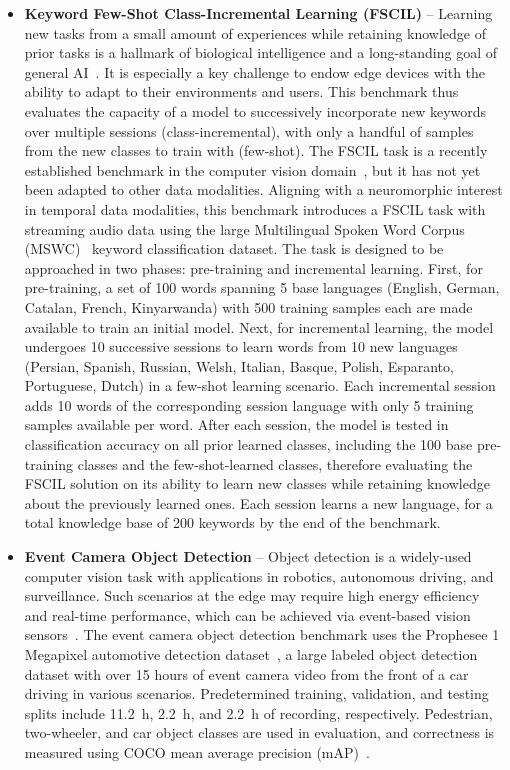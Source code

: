     \begin{itemize}
        \item \textbf{Keyword Few-Shot Class-Incremental Learning (FSCIL)} --
        Learning new tasks from a small amount of experiences while retaining knowledge of prior tasks is a hallmark of biological intelligence and a long-standing goal of general AI~\cite{kudithipudi22biological}. It is especially a key challenge to endow edge devices with the ability to adapt to their environments and users. This benchmark thus evaluates the capacity of a model to successively incorporate new keywords over multiple sessions (class-incremental), with only a handful of samples from the new classes to train with (few-shot). The FSCIL task is a recently established benchmark in the computer vision domain~\cite{tao2020fscil}, but it has not yet been adapted to other data modalities. Aligning with a neuromorphic interest in temporal data modalities, this benchmark introduces a FSCIL task with streaming audio data using the large Multilingual Spoken Word Corpus (MSWC)~\cite{mazumder21mswc} keyword classification dataset. The task is designed to be approached in two phases: pre-training and incremental learning. First, for pre-training, a set of 100 words spanning 5 base languages (English, German, Catalan, French, Kinyarwanda) with 500 training samples each are made available to train an initial model. Next, for incremental learning, the model undergoes 10 successive sessions to learn words from 10 new languages (Persian, Spanish, Russian, Welsh, Italian, Basque, Polish, Esparanto, Portuguese, Dutch) in a few-shot learning scenario. Each incremental session adds 10 words of the corresponding session language with only 5 training samples available per word. After each session, the model is tested in classification accuracy on all prior learned classes, including the 100 base pre-training classes and the few-shot-learned classes,
        therefore evaluating the FSCIL solution on its ability to learn new classes while retaining knowledge about the previously learned ones. Each session learns a new language, for a total knowledge base of 200 keywords by the end of the benchmark.

        
        \item \textbf{Event Camera Object Detection} --
        Object detection is a widely-used computer vision task with applications in robotics, autonomous driving, and surveillance. Such scenarios at the edge may require high energy efficiency and real-time performance, which can be achieved via event-based vision sensors~\cite{Gallego2022}. The event camera object detection benchmark uses the Prophesee 1 Megapixel automotive detection dataset~\cite{Perot2020}, a large labeled object detection dataset with over 15 hours of event camera video from the front of a car driving in various scenarios. Predetermined training, validation, and testing splits include \SI{11.2}{\hour}, \SI{2.2}{\hour}, and \SI{2.2}{\hour} of recording, respectively. Pedestrian, two-wheeler, and car object classes are used in evaluation, and correctness is measured using COCO mean average precision (mAP)~\cite{LinCOCO_2014}.
        

\end{itemize}
